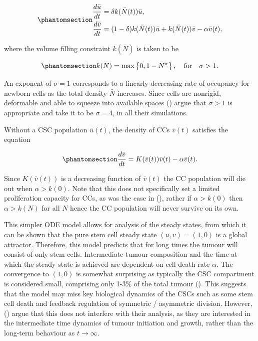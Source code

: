 \documentclass[
  letterpaper,
]{scrreprt}
\theoremstyle{definition}
\theoremstyle{remark}
\begin{document}
\begin{equation}\phantomsection\label{eq-ODE-CSC-model}{
\begin{aligned}
    \frac{d \bar{u}}{dt} &= \delta  k(\bar{N}(t)) \bar{u}, \\
    \frac{d \bar{v}}{dt} &= (1-\delta)  k(\bar{N}(t)) \bar{u} + k(\bar{N}(t)) \bar{v} - \alpha \bar{v}(t),
\end{aligned}
}\end{equation}

where the volume filling constraint \(k(\bar{N})\) is taken to be

\begin{equation}\phantomsection\label{eq-volume-filling-constraint}{
k(\bar{N}) = \text{max} \left\{0, 1 - \bar{N}^\sigma \right\}, \quad \text{for} \quad \sigma > 1.
}\end{equation}

An exponent of \(\sigma = 1\) corresponds to a linearly decreasing rate
of occupancy for newborn cells as the total density \(\bar{N}\)
increases. Since cells are nonrigid, deformable and able to squeeze into
available spaces () argue that \(\sigma > 1\) is appropriate and take it to
be \(\sigma = 4\), in all their simulations.

Without a CSC population \(\bar{u}(t)\), the density of CCs
\(\bar{v}(t)\) satisfies the equation

\begin{equation}\phantomsection\label{eq-ODE-TC-only-model}{
\frac{d\bar{v}}{dt}  =K(\bar{v}(t))\bar{v}(t) - \alpha \bar{v}(t).
}\end{equation}

Since \(K(\bar{v}(t))\) is a decreasing function of \(\bar{v}(t)\) the
CC population will die out when \(\alpha > k(0)\). Note that this does
not specifically set a limited proliferation capacity for CCs, as was
the case in (),
rather if \(\alpha > k(0)\) then \(\alpha > k(N)\) for all \(N\) hence
the CC population will never survive on its own.

This simpler ODE model allows for analysis of the steady states, from
which it can be shown that the pure stem cell steady state
\((u,v)= (1,0)\) is a global attractor. Therefore, this model predicts
that for long times the tumour will consist of only stem cells.
Intermediate tumour composition and the time at which the steady state
is achieved are dependent on cell death rate \(\alpha\). The convergence
to \((1,0)\) is somewhat surprising as typically the CSC compartment is
considered small, comprising only 1-3\% of the total tumour
(). This suggests that the model
may miss key biological dynamics of the CSCs such as some stem cell
death and feedback regulation of symmetric / asymmetric division.
However, () argue that this does not interfere with their analysis, as they
are interested in the intermediate time dynamics of tumour initiation
and growth, rather than the long-term behaviour as
\(t \rightarrow \infty\).
\end{document}
